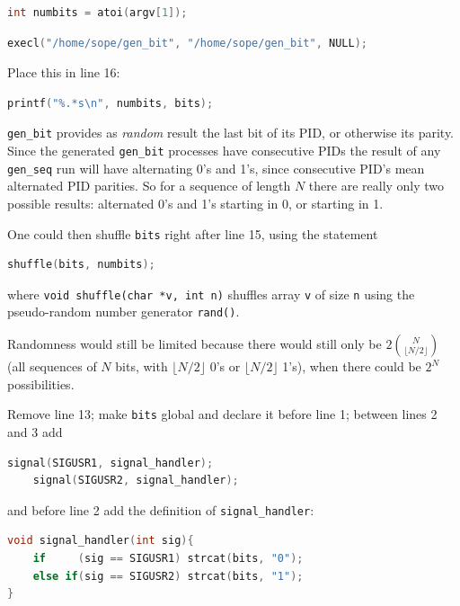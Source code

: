 \documentclass{sope}
\begin{document}
\begin{lstlisting}[language=C]
    int numbits = atoi(argv[1]);
\end{lstlisting}
\begin{lstlisting}[language=C]
    execl("/home/sope/gen_bit", "/home/sope/gen_bit", NULL);
\end{lstlisting}
Place this in line 16:
\begin{lstlisting}[language=C]
    printf("%.*s\n", numbits, bits);
\end{lstlisting}

\texttt{gen\_bit} provides as \emph{random} result the last bit of its PID, or otherwise its parity. Since the generated \texttt{gen\_bit} processes have consecutive PIDs the result of any \texttt{gen\_seq} run will have alternating 0's and 1's, since consecutive PID's mean alternated PID parities. So for a sequence of length $N$ there are really only two possible results: alternated 0's and 1's starting in 0, or starting in 1.

One could then shuffle \texttt{bits} right after line 15, using the statement
\begin{lstlisting}[language=C]
    shuffle(bits, numbits);
\end{lstlisting}
where \texttt{void shuffle(char *v, int n)} shuffles array \texttt{v} of size \texttt{n} using the pseudo-random number generator \texttt{rand()}.

Randomness would still be limited because there would still only be $2\binom{N}{\lfloor N/2 \rfloor}$ (all sequences of $N$ bits, with $\lfloor N/2 \rfloor$ 0's or $\lfloor N/2 \rfloor$ 1's), when there could be $2^N$ possibilities.

Remove line 13; make \texttt{bits} global and declare it before line 1; between lines 2 and 3 add
\begin{lstlisting}[language=C]
    signal(SIGUSR1, signal_handler);
    signal(SIGUSR2, signal_handler);
\end{lstlisting}
and before line 2 add the definition of \texttt{signal\_handler}:
\begin{lstlisting}[language=C]
void signal_handler(int sig){
    if     (sig == SIGUSR1) strcat(bits, "0");
    else if(sig == SIGUSR2) strcat(bits, "1");
}
\end{lstlisting}
\end{document}
